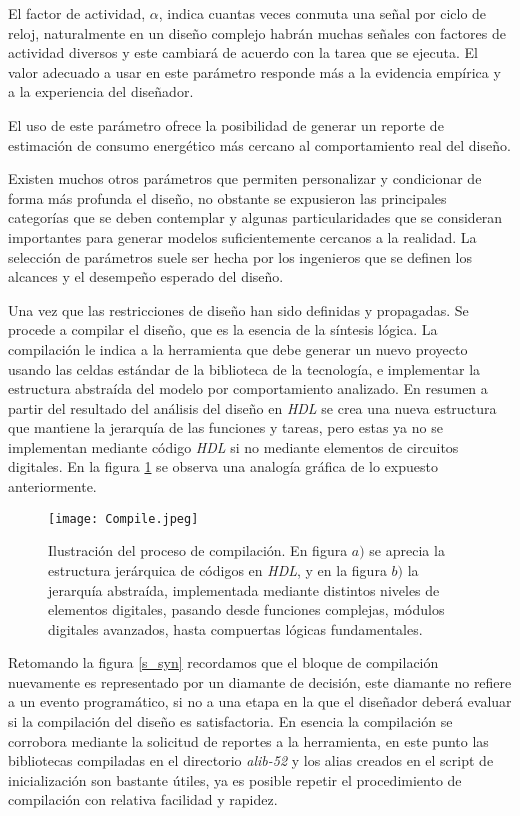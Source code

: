 \begin{itemize}
{El factor de actividad, $\alpha$, indica cuantas veces conmuta una señal por ciclo de reloj, naturalmente en un diseño complejo habrán muchas señales con factores de actividad diversos y este cambiará de acuerdo con la tarea que se ejecuta. El valor adecuado a usar en este parámetro responde más a la evidencia empírica y a la experiencia del diseñador.\cite{book:weste2005}

El uso de este parámetro ofrece la posibilidad de generar un reporte de estimación de consumo energético más cercano al comportamiento real del diseño.}
\end{itemize}

Existen muchos otros parámetros que permiten personalizar y condicionar de forma más profunda el diseño, no obstante se expusieron las principales categorías que se deben contemplar y algunas particularidades que se consideran importantes para generar modelos suficientemente cercanos a la realidad. La selección de parámetros suele ser hecha por los ingenieros que se definen los alcances y el desempeño esperado del diseño.

Una vez que las restricciones de diseño han sido definidas y propagadas. Se procede a compilar el diseño, que es la esencia de la síntesis lógica. La compilación le indica a la herramienta que debe generar un nuevo proyecto usando las celdas estándar de la biblioteca de la tecnología, e implementar la estructura abstraída del modelo por comportamiento analizado. En resumen a partir del resultado del análisis del diseño en \textit{HDL} se crea una nueva estructura que mantiene la jerarquía de las funciones y tareas, pero estas ya no se implementan mediante código \textit{HDL} si no mediante elementos de circuitos digitales. En la figura \ref{comp} se observa una analogía gráfica de lo expuesto anteriormente.

\begin{figure}[h]
\texttt{[image: Compile.jpeg]}
\centering
\caption{Ilustración del proceso de compilación. En figura \textbf{$a)$} se aprecia la estructura jerárquica de códigos en \textit{HDL}, y en la figura \textbf{$b)$} la jerarquía abstraída, implementada mediante distintos niveles de elementos digitales, pasando desde funciones complejas, módulos digitales avanzados, hasta compuertas lógicas fundamentales.}
\label{comp}
\end{figure}

Retomando la figura \ref{s_syn} recordamos que el bloque de compilación nuevamente es representado por un diamante de decisión, este diamante no refiere a un evento programático, si no a una etapa en la que el diseñador deberá evaluar si la compilación del diseño es satisfactoria. En esencia la compilación se corrobora mediante la solicitud de reportes a la herramienta, en este punto las bibliotecas compiladas en el directorio \textit{alib-52} y los alias creados en el script de inicialización son bastante útiles, ya es posible repetir el procedimiento de compilación con relativa facilidad y rapidez.

